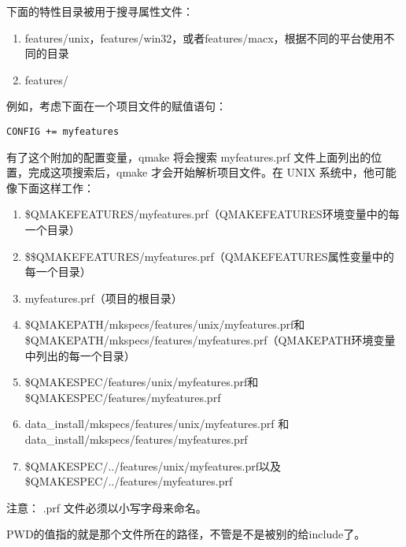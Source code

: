 下面的特性目录被用于搜寻属性文件：

\begin{enumerate}

\item
  features/unix，features/win32，或者features/macx，根据不同的平台使用不同的目录
\item
  features/
\end{enumerate}

例如，考虑下面在一个项目文件的赋值语句：

\begin{verbatim}
CONFIG += myfeatures
\end{verbatim}

有了这个附加的配置变量，qmake 将会搜索 myfeatures.prf
文件上面列出的位置，完成这项搜索后，qmake 才会开始解析项目文件。在 UNIX
系统中，他可能像下面这样工作：

\begin{enumerate}
\item
  \$QMAKEFEATURES/myfeatures.prf（QMAKEFEATURES环境变量中的每一个目录）
\item
  \$\$QMAKEFEATURES/myfeatures.prf（QMAKEFEATURES属性变量中的每一个目录）
\item
  myfeatures.prf（项目的根目录）
\item
  \$QMAKEPATH/mkspecs/features/unix/myfeatures.prf和\$QMAKEPATH/mkspecs/features/myfeatures.prf（QMAKEPATH环境变量中列出的每一个目录）
\item
  \$QMAKESPEC/features/unix/myfeatures.prf和
  \$QMAKESPEC/features/myfeatures.prf
\item
  data\_install/mkspecs/features/unix/myfeatures.prf
  和data\_install/mkspecs/features/myfeatures.prf
\item
  \$QMAKESPEC/../features/unix/myfeatures.prf以及\$QMAKESPEC/../features/myfeatures.prf
\end{enumerate}

注意： .prf 文件必须以小写字母来命名。

PWD的值指的就是那个文件所在的路径，不管是不是被别的给include了。
